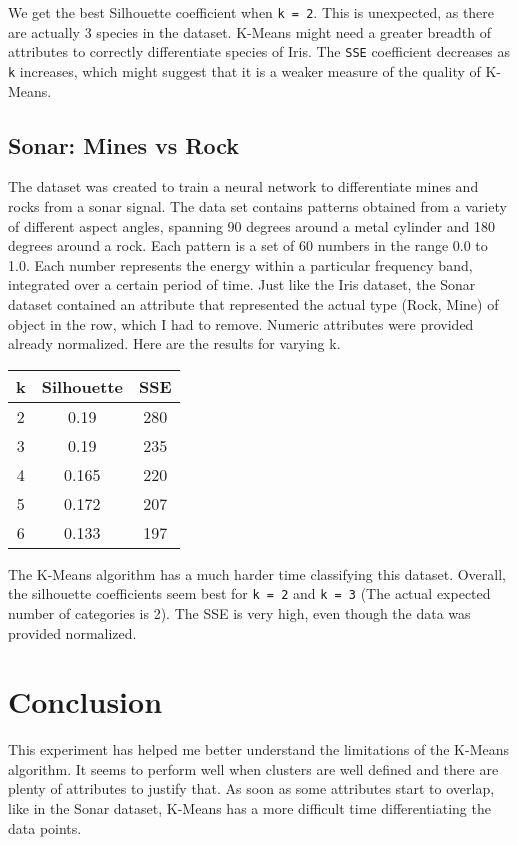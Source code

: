 \documentclass[12pt,letterpaper]{article}
\begin{document}
We get the best Silhouette coefficient when \texttt{k = 2}. This is unexpected, as there are actually 3 species in the dataset. K-Means might need a greater breadth of attributes to correctly differentiate species of Iris. The \texttt{SSE} coefficient decreases as \texttt{k} increases, which might suggest that it is a weaker measure of the quality of K-Means.

\subsection{Sonar: Mines vs Rock}

The dataset was created to train a neural network to differentiate mines and rocks from a sonar signal. The data set contains patterns obtained from a variety of different aspect angles, spanning 90
degrees around a metal cylinder and 180 degrees around a rock. Each pattern is a set of 60 numbers in the range 0.0 to 1.0.  Each number represents the energy within a particular frequency band, integrated over a certain period of time. Just like the Iris dataset, the Sonar dataset contained an attribute that represented the actual type (Rock, Mine) of object in the row, which I had to remove. Numeric attributes were provided already normalized. Here are the results for varying k.


\begin{center}
 \begin{tabular}{||c c c||} 
 \hline
 k & Silhouette & SSE \\ [0.5ex] 
 \hline\hline
 2 & 0.19 & 280 \\ 
 \hline
 3 & 0.19 & 235 \\
 \hline
 4 & 0.165 & 220 \\
 \hline
 5 & 0.172 & 207 \\
 \hline
 6 & 0.133 & 197 \\ [1ex] 
 \hline
\end{tabular}
\end{center}

The K-Means algorithm has a much harder time classifying this dataset. Overall, the silhouette coefficients seem best for \texttt{k = 2} and \texttt{k = 3} (The actual expected number of categories is 2). The SSE is very high, even though the data was provided normalized.

\section{Conclusion}

This experiment has helped me better understand the limitations of the K-Means algorithm. It seems to perform well when clusters are well defined and there are plenty of attributes to justify that. As soon as some attributes start to overlap, like in the Sonar dataset, K-Means has a more difficult time differentiating the data points.
\end{document}
